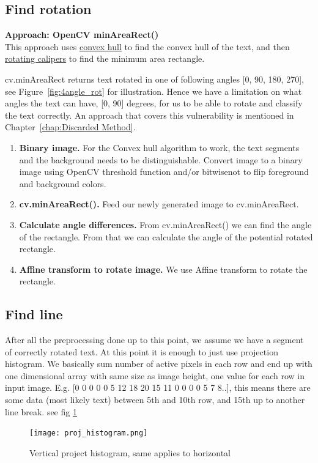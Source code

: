 \documentclass[Report.tex]{subfiles}
\begin{document}
\subsection{Find rotation}
\label{subsec:Find rotation}
\textbf{Approach: OpenCV minAreaRect()} \\
This approach uses \href{https://en.wikipedia.org/wiki/Convex_hull}{convex hull}
to find the convex hull of the text, and then
\href{https://en.wikipedia.org/wiki/Rotating_calipers}{rotating calipers} to
find the minimum area rectangle. \par
cv.minAreaRect returns text rotated in one of following angles [0\textdegree, 90\textdegree, 180\textdegree, 270\textdegree], see Figure~\ref{fig:4angle_rot} for illustration.
Hence we have a limitation on what angles the text can have, [0, 90] degrees, for us to be able to rotate and classify the text correctly. An approach that covers this vulnerability is mentioned in Chapter~\ref{chap:Discarded Method}.

\begin{flushleft}
  \begin{enumerate}
    \item \textbf{Binary image.}
    For the Convex hull algorithm to work, the text segments and the background needs to be distinguishable. Convert image to a binary image using OpenCV threshold function and/or bitwise\textunderscore not to flip foreground and background colors.
    \item \textbf{cv.minAreaRect().}
    Feed our newly generated image to cv.minAreaRect.
    \item \textbf{Calculate angle differences.}
    From cv.minAreaRect() we can find the angle of the rectangle. From that we can calculate the angle of the potential rotated rectangle.
    \item \textbf{Affine transform to rotate image.}
    We use Affine transform to rotate the rectangle.
    \end{enumerate}
\end{flushleft}





\subsection{Find line}\label{subsec:Find_line}
After all the preprocessing done up to this point, we assume we have a segment of correctly rotated text. At this point it is enough to just use projection histogram. We basically sum number of active pixels in each row and end up with one dimensional array with same size as image height, one value for each row in input image.
E.g. [0 0 0 0 0 5 12 18 20 15 11 0 0 0 0 5 7 8..], this means there are some data (most likely text) between 5th and 10th row, and 15th  up to another line break. see fig \ref{fig:Project_histogram}
\begin{figure}[H]
  \centering
  \texttt{[image: proj\_histogram.png]}
  \caption{Vertical project histogram, same applies to horizontal}
  \label{fig:Project_histogram}
\end{figure}
\end{document}
